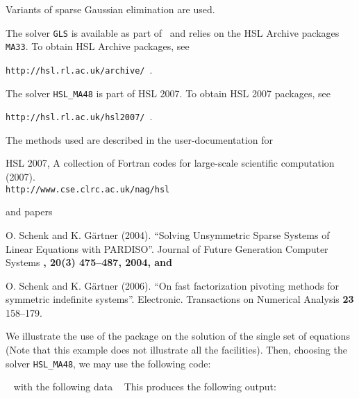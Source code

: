 \documentclass{galahad}
\begin{document}

\galmethod
Variants of sparse Gaussian elimination are used.

\noindent
The solver {\tt GLS} is available as part of \galahad\ and relies on
the HSL Archive packages {\tt MA33}. To obtain HSL Archive packages, see

{\tt http://hsl.rl.ac.uk/archive/ }.

\noindent
The solver {\tt HSL\_MA48}
is part of HSL 2007.
To obtain HSL 2007 packages, see

{\tt http://hsl.rl.ac.uk/hsl2007/ }.



\vspace*{1mm}

\galreferences
\vspace*{1mm}

\noindent
The methods used are described in the user-documentation for
\vspace*{1mm}

\noindent
HSL 2007, A collection of {F}ortran codes for large-scale scientific
 computation (2007). \\
 {\tt http://www.cse.clrc.ac.uk/nag/hsl}

\noindent
and papers

\noindent
O. Schenk and K. G\"{a}rtner (2004).
``Solving Unsymmetric Sparse Systems of Linear Equations with PARDISO''.
Journal of Future Generation Computer Systems \bf, 20(3) \rm 475--487, 2004,
and

\noindent
O. Schenk and K. G\"{a}rtner (2006).
``On fast factorization pivoting methods for symmetric indefinite systems''.
Electronic. Transactions on Numerical Analysis
{\bf 23} 158--179.


\galexample
We illustrate the use of the package on the solution of the
single set of equations
(Note that this example does not illustrate all the facilities).
Then, choosing the solver {\tt HSL\_MA48}, we may use the following code:

{\tt \small
\VerbatimInput{\packageexample}
}
\noindent
with the following data
{\tt \small
\VerbatimInput{\packagedata}
}
\noindent
This produces the following output:
{\tt \small
\VerbatimInput{\packageresults}
}
\noindent
\end{document}

